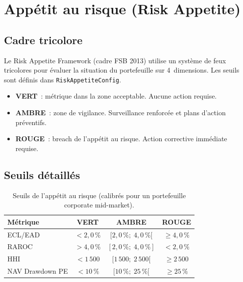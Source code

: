 \documentclass[12pt,a4paper]{article}
\begin{document}
\section{App\'etit au risque (Risk Appetite)}
\label{sec:risk_appetite}

\subsection{Cadre tricolore}

Le Risk Appetite Framework (cadre FSB 2013) utilise un syst\`eme de feux tricolores pour \'evaluer la situation du portefeuille sur 4~dimensions. Les seuils sont d\'efinis dans \texttt{RiskAppetiteConfig}.

\begin{definitionbox}
\begin{itemize}[nosep]
    \item \textcolor{accentgreen}{\textbf{VERT}}~: m\'etrique dans la zone acceptable. Aucune action requise.
    \item \textcolor{accentorange}{\textbf{AMBRE}}~: zone de vigilance. Surveillance renforc\'ee et plans d'action pr\'eventifs.
    \item \textcolor{accentred}{\textbf{ROUGE}}~: breach de l'app\'etit au risque. Action corrective imm\'ediate requise.
\end{itemize}
\end{definitionbox}

\subsection{Seuils d\'etaill\'es}

\begin{table}[h]
\centering
\begin{tabular}{lccc}
\toprule
\textbf{M\'etrique} & \textcolor{accentgreen}{\textbf{VERT}} & \textcolor{accentorange}{\textbf{AMBRE}} & \textcolor{accentred}{\textbf{ROUGE}} \\
\midrule
ECL/EAD & $< 2{,}0\,\%$ & $[2{,}0\,\% ;\; 4{,}0\,\%[$ & $\geq 4{,}0\,\%$ \\
RAROC & $> 4{,}0\,\%$ & $[2{,}0\,\% ;\; 4{,}0\,\%]$ & $< 2{,}0\,\%$ \\
HHI & $< 1\,500$ & $[1\,500 ;\; 2\,500[$ & $\geq 2\,500$ \\
NAV Drawdown PE & $< 10\,\%$ & $[10\,\% ;\; 25\,\%[$ & $\geq 25\,\%$ \\
\bottomrule
\end{tabular}
\caption{Seuils de l'app\'etit au risque (calibr\'es pour un portefeuille corporate mid-market).}
\label{tab:risk_appetite}
\end{table}
\end{document}
